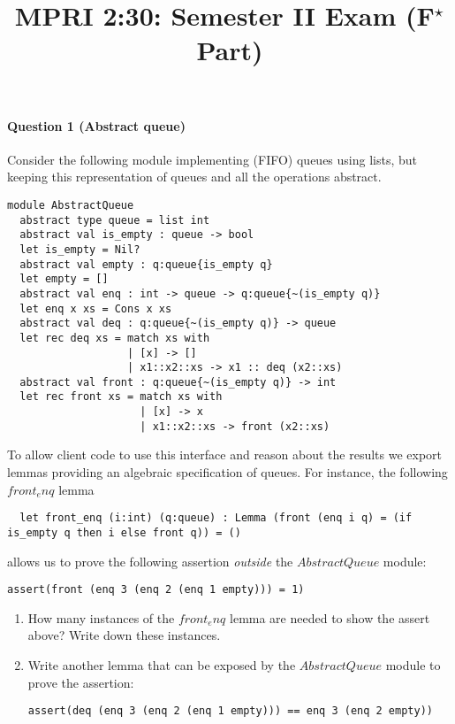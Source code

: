 \documentclass[a4paper,11pt]{article}
\newcommand\fstar{F$^\star$\xspace}
\begin{document}
\author{}

\title{MPRI 2:30: Semester II Exam (\fstar{} Part)}

\date{}

\maketitle

\paragraph{Question 1 (Abstract queue)}
Consider the following module implementing (FIFO) queues using lists,
but keeping this representation of queues and all the operations abstract.
\begin{lstlisting}
module AbstractQueue
  abstract type queue = list int
  abstract val is_empty : queue -> bool
  let is_empty = Nil?
  abstract val empty : q:queue{is_empty q}
  let empty = []
  abstract val enq : int -> queue -> q:queue{~(is_empty q)}
  let enq x xs = Cons x xs
  abstract val deq : q:queue{~(is_empty q)} -> queue
  let rec deq xs = match xs with
                   | [x] -> []
                   | x1::x2::xs -> x1 :: deq (x2::xs)
  abstract val front : q:queue{~(is_empty q)} -> int
  let rec front xs = match xs with
                     | [x] -> x
                     | x1::x2::xs -> front (x2::xs)
\end{lstlisting}
To allow client code to use this interface and reason about the
results we export lemmas providing an algebraic specification of
queues. For instance, the following \ls$front_enq$ lemma
\begin{lstlisting}
  let front_enq (i:int) (q:queue) : Lemma (front (enq i q) = (if is_empty q then i else front q)) = ()
\end{lstlisting}
allows us to prove the following assertion {\em outside} the
\ls$AbstractQueue$ module:
\begin{lstlisting}
assert(front (enq 3 (enq 2 (enq 1 empty))) = 1)
\end{lstlisting}
\begin{enumerate}[label={\bf (\alph*)},topsep=0pt]
\item How many instances of the \ls$front_enq$ lemma are needed to show
      the assert above? Write down these instances.
\vspace{2.5cm}
\item Write another lemma that can be exposed by the
  \ls$AbstractQueue$ module to prove the assertion:
\begin{lstlisting}
assert(deq (enq 3 (enq 2 (enq 1 empty))) == enq 3 (enq 2 empty))
\end{lstlisting}
\end{enumerate}
\end{document}
